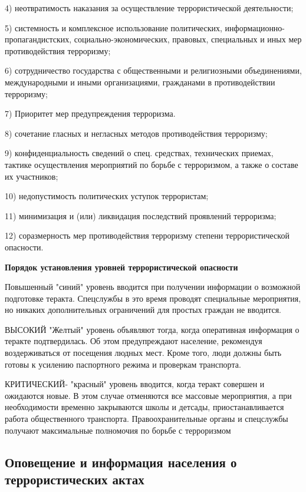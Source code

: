 \documentclass[a4paper, 12pt]{article}
\theoremstyle{definition}
\begin{document}
        4) неотвратимость наказания за осуществление террористической деятельности;

        5) системность и комплексное использование политических, информационно-пропагандистских, социально-экономических, правовых, специальных и иных мер противодействия терроризму;

        6) сотрудничество государства с общественными и религиозными объединениями, международными и иными организациями, гражданами в противодействии терроризму;

        7) Приоритет мер предупреждения терроризма.

        8) сочетание гласных и негласных методов противодействия терроризму;

        9) конфиденциальность сведений о спец. средствах, технических приемах, тактике осуществления мероприятий по борьбе с терроризмом, а также о составе их участников;

        10) недопустимость политических уступок террористам;

        11) минимизация и (или) ликвидация последствий проявлений терроризма;

        12) соразмерность мер противодействия терроризму степени террористической опасности.

        \begin{center}
            \textbf{Порядок установления уровней террористической опасности } 
        \end{center}

        Повышенный "синий" уровень вводится при получении информации о возможной подготовке теракта. Спецслужбы в это время проводят специальные мероприятия, но никаких дополнительных ограничений для простых граждан не вводится.

        ВЫСОКИЙ "Желтый" уровень объявляют тогда, когда оперативная информация о теракте подтвердилась. Об этом предупреждают население, рекомендуя воздерживаться от посещения людных мест. Кроме того, люди должны быть готовы к усилению паспортного режима и проверкам транспорта.

        КРИТИЧЕСКИЙ- "красный" уровень вводится, когда теракт совершен и\\ ожидаются новые. В этом случае отменяются все массовые мероприятия, а при необходимости временно закрываются школы и детсады, приостанавливается работа общественного транспорта. Правоохранительные органы и спецслужбы получают максимальные полномочия по борьбе с терроризмом

        \subsection{Оповещение и информация населения о террористических актах}
\end{document}
